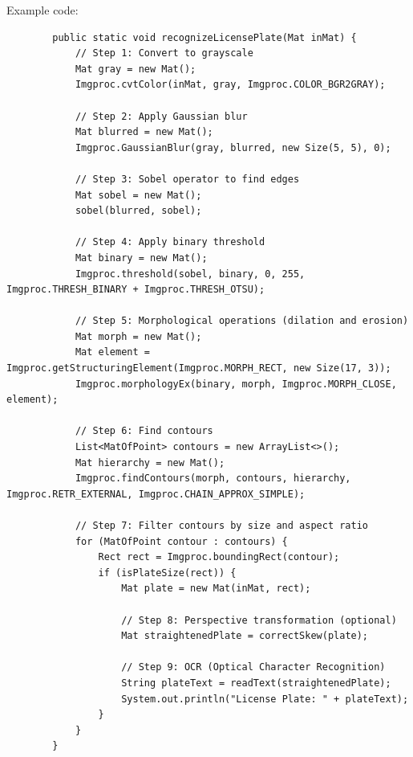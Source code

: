 \documentclass{article}
\begin{document}
		Example code:
		\begin{verbatim}
		public static void recognizeLicensePlate(Mat inMat) {
			// Step 1: Convert to grayscale
			Mat gray = new Mat();
			Imgproc.cvtColor(inMat, gray, Imgproc.COLOR_BGR2GRAY);
			
			// Step 2: Apply Gaussian blur
			Mat blurred = new Mat();
			Imgproc.GaussianBlur(gray, blurred, new Size(5, 5), 0);
			
			// Step 3: Sobel operator to find edges
			Mat sobel = new Mat();
			sobel(blurred, sobel);
			
			// Step 4: Apply binary threshold
			Mat binary = new Mat();
			Imgproc.threshold(sobel, binary, 0, 255, Imgproc.THRESH_BINARY + Imgproc.THRESH_OTSU);
			
			// Step 5: Morphological operations (dilation and erosion)
			Mat morph = new Mat();
			Mat element = Imgproc.getStructuringElement(Imgproc.MORPH_RECT, new Size(17, 3));
			Imgproc.morphologyEx(binary, morph, Imgproc.MORPH_CLOSE, element);
			
			// Step 6: Find contours
			List<MatOfPoint> contours = new ArrayList<>();
			Mat hierarchy = new Mat();
			Imgproc.findContours(morph, contours, hierarchy, Imgproc.RETR_EXTERNAL, Imgproc.CHAIN_APPROX_SIMPLE);
			
			// Step 7: Filter contours by size and aspect ratio
			for (MatOfPoint contour : contours) {
				Rect rect = Imgproc.boundingRect(contour);
				if (isPlateSize(rect)) {
					Mat plate = new Mat(inMat, rect);
					
					// Step 8: Perspective transformation (optional)
					Mat straightenedPlate = correctSkew(plate);
					
					// Step 9: OCR (Optical Character Recognition)
					String plateText = readText(straightenedPlate);
					System.out.println("License Plate: " + plateText);
				}
			}
		}
		\end{verbatim}
		
	
\end{document}
